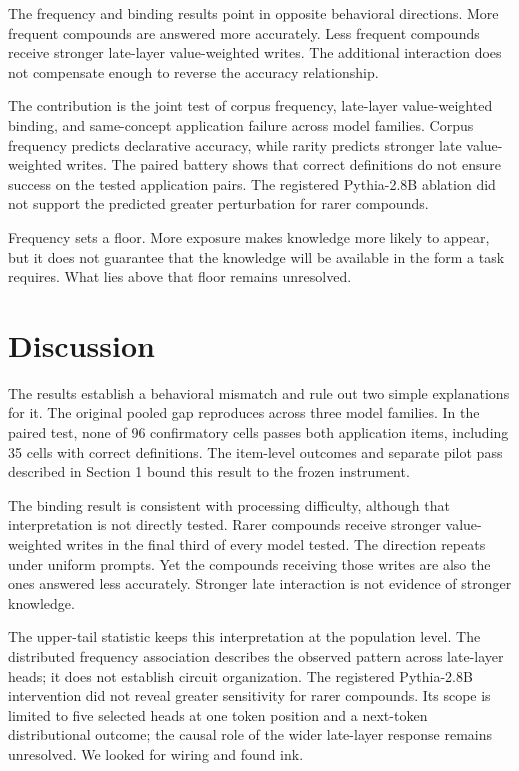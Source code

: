 \documentclass[
  english,
]{article}
\newcounter{none} %
\begin{document}
The frequency and binding results point in opposite behavioral directions. More frequent compounds are answered more accurately. Less frequent compounds receive stronger late-layer value-weighted writes. The additional interaction does not compensate enough to reverse the accuracy relationship.

The contribution is the joint test of corpus frequency, late-layer value-weighted binding, and same-concept application failure across model families. Corpus frequency predicts declarative accuracy, while rarity predicts stronger late value-weighted writes. The paired battery shows that correct definitions do not ensure success on the tested application pairs. The registered Pythia-2.8B ablation did not support the predicted greater perturbation for rarer compounds.

Frequency sets a floor. More exposure makes knowledge more likely to appear, but it does not guarantee that the knowledge will be available in the form a task requires. What lies above that floor remains unresolved.

\section{Discussion}\label{discussion}

The results establish a behavioral mismatch and rule out two simple explanations for it. The original pooled gap reproduces across three model families. In the paired test, none of 96 confirmatory cells passes both application items, including 35 cells with correct definitions. The item-level outcomes and separate pilot pass described in Section 1 bound this result to the frozen instrument.

The binding result is consistent with processing difficulty, although that interpretation is not directly tested. Rarer compounds receive stronger value-weighted writes in the final third of every model tested. The direction repeats under uniform prompts. Yet the compounds receiving those writes are also the ones answered less accurately. Stronger late interaction is not evidence of stronger knowledge.

The upper-tail statistic keeps this interpretation at the population level. The distributed frequency association describes the observed pattern across late-layer heads; it does not establish circuit organization. The registered Pythia-2.8B intervention did not reveal greater sensitivity for rarer compounds. Its scope is limited to five selected heads at one token position and a next-token distributional outcome; the causal role of the wider late-layer response remains unresolved. We looked for wiring and found ink.
\end{document}
